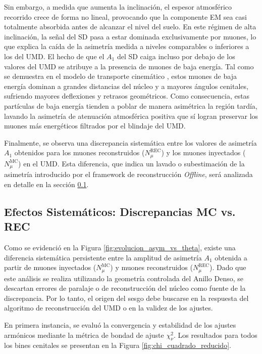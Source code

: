 Sin embargo, a medida que aumenta la inclinación, el espesor atmosférico recorrido crece de forma no lineal, provocando que la componente EM sea casi totalmente absorbida antes de alcanzar el nivel del suelo. En este régimen de alta inclinación, la señal del SD pasa a estar dominada exclusivamente por muones, lo que explica la caída de la asimetría medida a niveles comparables o inferiores a los del UMD. El hecho de que el $A_1$ del SD caiga incluso por debajo de los valores del UMD se atribuye a la presencia de muones de baja energía. Tal como se demuestra en el modelo de transporte cinemático \cite{Cazon2012}, estos muones de baja energía dominan a grandes distancias del núcleo y a mayores ángulos cenitales, sufriendo mayores deflexiones y retrasos geométricos. Como consecuencia, estas partículas de baja energía tienden a poblar de manera asimétrica la región tardía, lavando la asimetría de atenuación atmosférica positiva que sí logran preservar los muones más energéticos filtrados por el blindaje del UMD.

Finalmente, se observa una discrepancia sistemática entre los valores de asimetría $A_1$ obtenidos para los muones reconstruidos ($N^{\text{REC}}_\mu$) y los muones inyectados ($N^{\text{MC}}_\mu$) en el UMD. Esta diferencia, que indica un lavado o subestimación de la asimetría introducido por el framework de reconstrucción \textit{Offline}, será analizada en detalle en la sección \ref{subsec:mc_vs_rec}.

\subsection{Efectos Sistemáticos: Discrepancias MC vs. REC}
\label{subsec:mc_vs_rec}

Como se evidenció en la Figura \ref{fig:evolucion_asym_vs_theta}, existe una diferencia sistemática persistente entre la amplitud de asimetría $A_1$ obtenida a partir de muones inyectados ($N^{\text{MC}}_\mu$) y muones reconstruidos ($N^{\text{REC}}_\mu$). Dado que este análisis se realiza utilizando la geometría controlada del Anillo Denso, se descartan errores de paralaje o de reconstrucción del núcleo como fuente de la discrepancia. Por lo tanto, el origen del sesgo debe buscarse en la respuesta del algoritmo de reconstrucción del UMD o en la validez de los ajustes.

En primera instancia, se evaluó la convergencia y estabilidad de los ajustes armónicos mediante la métrica de bondad de ajuste $\chi^2_\nu$. Los resultados para todos los bines cenitales se presentan en la Figura \ref{fig:chi_cuadrado_reducido}.

